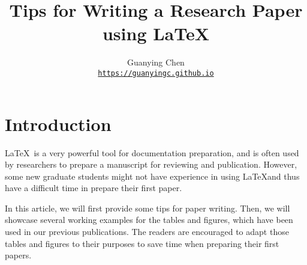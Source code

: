 \documentclass[10pt,twocolumn,letterpaper]{article}
\begin{document}
\title{Tips for Writing a Research Paper using \LaTeX}

\author{Guanying Chen \\
{\tt\small \url{https://guanyingc.github.io}}
}
\maketitle
{
    \hypersetup{linkcolor=black}
    \tableofcontents
}



\vspace{5em}
\section{Introduction}
\label{sec:intro}
\LaTeX\ is a very powerful tool for documentation preparation, and is often used by researchers to prepare a manuscript for reviewing and publication. 
However, some new graduate students might not have experience in using \LaTeX and thus have a difficult time in prepare their first paper. 

In this article, we will first provide some tips for paper writing.  
Then, we will showcase several working examples for the tables and figures, which have been used in our previous publications. The readers are encouraged to adapt those tables and figures to their purposes to save time when preparing their first papers.
\end{document}
